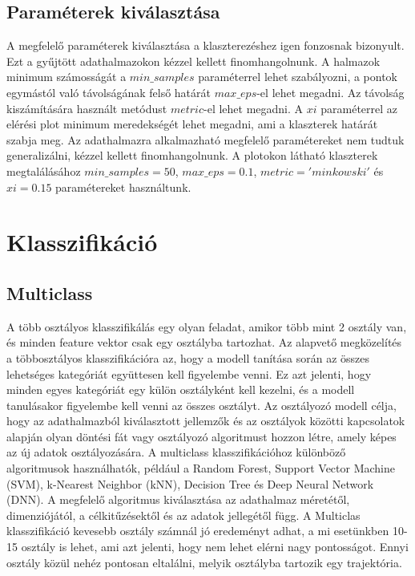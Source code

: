 \documentclass[acmtog, authorversion]{acmart}
\begin{document}
\subsection{Paraméterek kiválasztása}
A megfelelő paraméterek kiválasztása a klaszterezéshez igen fonzosnak bizonyult. Ezt a gyűjtött adathalmazokon kézzel kellett finomhangolnunk.
A halmazok minimum számosságát a \begin{math}min\_samples\end{math} paraméterrel lehet szabályozni, a pontok egymástól való távolságának
felső határát \begin{math}max\_eps\end{math}-el lehet megadni. Az távolság kiszámítására használt metódust \begin{math}metric\end{math}-el
lehet megadni. A \begin{math}xi\end{math} paraméterrel az elérési plot minimum meredekségét lehet megadni, ami a klaszterek határát szabja meg.
Az adathalmazra alkalmazható megfelelő paramétereket nem tudtuk generalizálni, kézzel kellett finomhangolnunk. A plotokon látható klaszterek
megtalálásához \begin{math}min\_samples=50\end{math}, \begin{math}max\_eps=0.1\end{math}, \begin{math}metric='minkowski'\end{math} és \begin{math}xi=0.15\end{math}
paramétereket használtunk.
\section{Klasszifikáció}
\subsection{Multiclass}
A több osztályos klasszifikálás egy olyan feladat, amikor több mint 2 osztály van, és minden feature vektor csak egy osztályba tartozhat. Az alapvető megközelítés a többosztályos klasszifikációra az, hogy a modell tanítása során az összes lehetséges kategóriát együttesen kell figyelembe venni. Ez azt jelenti, hogy minden egyes kategóriát egy külön osztályként kell kezelni, és a modell tanulásakor figyelembe kell venni az összes osztályt. Az osztályozó modell célja, hogy az adathalmazból kiválasztott jellemzők és az osztályok közötti kapcsolatok alapján olyan döntési fát vagy osztályozó algoritmust hozzon létre, amely képes az új adatok osztályozására. A multiclass klasszifikációhoz különböző algoritmusok használhatók, például a Random Forest, Support Vector Machine (SVM), k-Nearest Neighbor (kNN), Decision Tree és Deep Neural Network (DNN). A megfelelő algoritmus kiválasztása az adathalmaz méretétől, dimenziójától, a célkitűzésektől és az adatok jellegétől függ.
A Multiclas klasszifikáció kevesebb osztály számnál jó eredeményt adhat, a mi esetünkben 10-15 osztály is lehet, ami azt jelenti, hogy nem lehet elérni nagy pontosságot. Ennyi osztály közül nehéz pontosan eltalálni, melyik osztályba tartozik egy trajektória.
\end{document}
